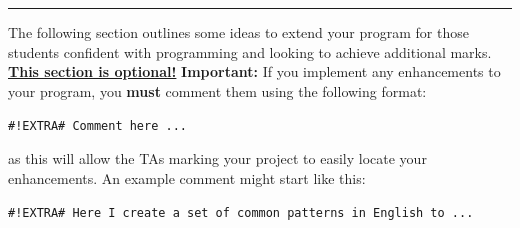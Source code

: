 \documentclass[11pt]{report}
\begin{document}

\vspace{1em}
\hrule
\vspace{1em}


\begin{Exercise}[title=(* Optional) Enhancements]

The following section outlines some ideas to extend your program for those students confident with programming and looking to achieve additional marks. \textbf{\underline{This section is optional!}} \newline\textbf{Important:} If you implement any enhancements to your program, you \textbf{must} comment them using the following format:

\vspace{0.5em}
{\tt \#!EXTRA\# Comment here ...}
\vspace{0.5em}

as this will allow the TAs marking your project to easily locate your enhancements. An example comment might start like this:

\vspace{0.5em}
{\tt \#!EXTRA\# Here I create a set of common patterns in English to ...}
\vspace{0.5em}


\end{Exercise}
\end{document}
